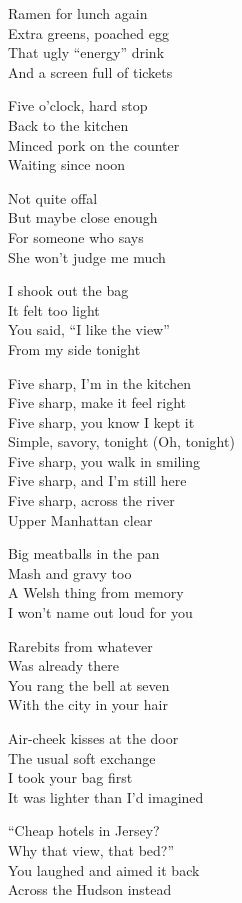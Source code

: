 \begin{lyrics}
Ramen for lunch again\\
Extra greens, poached egg\\
That ugly “energy” drink\\
And a screen full of tickets

Five o’clock, hard stop\\
Back to the kitchen\\
Minced pork on the counter\\
Waiting since noon

Not quite offal\\
But maybe close enough\\
For someone who says\\
She won’t judge me much

I shook out the bag\\
It felt too light\\
You said, “I like the view”\\
From my side tonight

Five sharp, I’m in the kitchen\\
Five sharp, make it feel right\\
Five sharp, you know I kept it\\
Simple, savory, tonight
(Oh, tonight)\\
Five sharp, you walk in smiling\\
Five sharp, and I’m still here\\
Five sharp, across the river\\
Upper Manhattan clear

Big meatballs in the pan\\
Mash and gravy too\\
A Welsh thing from memory\\
I won’t name out loud for you

Rarebits from whatever\\
Was already there\\
You rang the bell at seven\\
With the city in your hair

Air-cheek kisses at the door\\
The usual soft exchange\\
I took your bag first\\
It was lighter than I’d imagined

“Cheap hotels in Jersey?\\
Why that view, that bed?”\\
You laughed and aimed it back\\
Across the Hudson instead


\end{lyrics}
